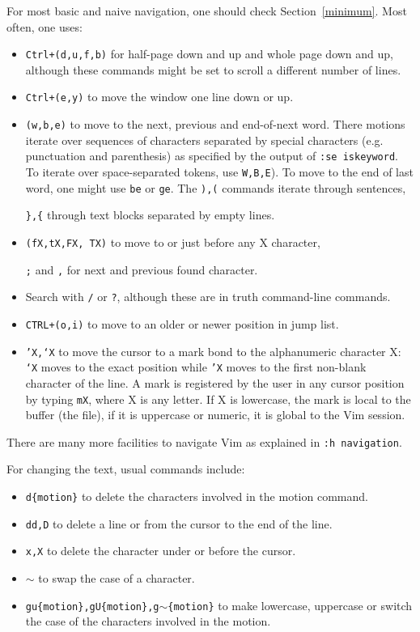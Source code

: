 \documentclass{article}
\newcommand{\tttt}[1] {
	\texttt{#1}}
\begin{document}
For most basic and naive navigation, one should check Section~\ref{minimum}.
Most often, one uses:
\begin{itemize}
  \item \texttt{Ctrl+(d,u,f,b)} for half-page down and up
and whole page down and up, although these commands might
be set to scroll a different number of lines.
  \item \texttt{Ctrl+(e,y)} to move the window one line down or up.
  \item \texttt{(w,b,e)} to move to the next, previous and end-of-next word. There motions iterate over sequences of characters separated
    by special characters (e.g. punctuation and parenthesis) as
    specified by the output of \texttt{:se iskeyword}.
    To iterate over space-separated tokens, use \texttt{W,B,E}).
    To move to the end of last word, one might use \texttt{be}
    or \texttt{ge}.
The \texttt{),(} commands iterate through sentences,
		\tttt{\},\{} through text blocks separated by empty lines.
  \item \texttt{(fX,tX,FX, TX)} to move to or just before any X character,
	  \tttt{;} and \tttt{,} for next and previous found character.
  \item Search with \tttt{/} or \tttt{?}, although these are in truth command-line commands.
  \item \texttt{CTRL+(o,i)} to move to an older or newer position in
    jump list.
  \item \texttt{'X,`X} to move the cursor to a mark bond to the alphanumeric character X: \texttt{`X} moves to the exact position while \texttt{'X} moves to
    the first non-blank character of the line.
    A mark is registered by the user in any cursor position
    by typing \texttt{mX}, where X is any letter.
    If X is lowercase, the mark is local to the buffer (the file),
    if it is uppercase or numeric, it is global to the Vim session.
\end{itemize}

There are many more facilities to navigate Vim
as explained in \texttt{:h navigation}.

For changing the text, usual commands include:
\begin{itemize}
  \item \texttt{d\{motion\}} to delete the characters
    involved in the motion command.
  \item \texttt{dd,D} to delete a line or from the cursor to the end of the line.
  \item \texttt{x,X} to delete the character under or before the cursor.
  \item \texttt{$\sim$} to swap the case of a character.
  \item \texttt{gu\{motion\},gU\{motion\},g$\sim$\{motion\}} to make lowercase, uppercase or switch the case of the characters involved in the motion.
\end{itemize}
\end{document}
